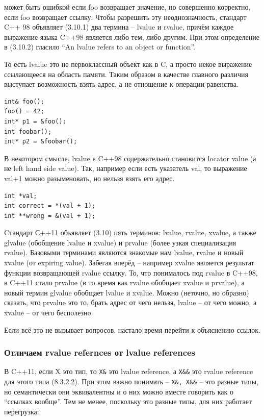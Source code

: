 \documentclass[a4paper,12pt,oneside]{article}
\begin{document}
может быть ошибкой если foo возвращает значение, но совершенно корректно, если foo возвращает ссылку. Чтобы разрешить эту неоднозначность, стандарт C++ 98 объявляет (3.10.1) два термина -- lvalue и rvalue, причём каждое выражение языка C++98 является либо тем, либо другим. При этом определение в (3.10.2) гласило ``An lvalue refers to an object or function''.

То есть lvalue это не первоклассный объект как в C, а просто некое выражение ссылающееся на область памяти. Таким образом в качестве главного различия выступает возможность взять адрес, а не отношение к операции равенства.

\begin{lstlisting}
int& foo();
foo() = 42;
int* p1 = &foo();
int foobar();
int* p2 = &foobar();
\end{lstlisting}

В некотором смысле, lvalue в C++98 содержательно становится locator value (а не left hand side value). Так, например если есть указатель val, то выражение val+1 можно разыменовать, но нельзя взять его адрес.

\begin{lstlisting}
int *val;
int correct = *(val + 1);
int **wrong = &(val + 1);
\end{lstlisting}

Cтандарт С++11 объявляет (3.10) пять терминов: lvalue, rvalue, xvalue, а также glvalue (обобщение lvalue и xvalue) и prvalue (более узкая специализация rvalue). Базовыми терминами являются знакомые нам lvalue, rvalue и новый xvalue (от expiring value). Забегая вперёд -- например xvalue является результат функции возвращающей rvalue ссылку. То, что понималось под rvalue в C++98, в C++11 стало prvalue (в то время как rvalue обобщает xvalue и prvalue), а новый термин glvalue обобщает lvalue и xvalue. Можно (неточно, но образно) сказать, что prvalue это то, брать адрес от чего нельзя, lvalue -- от чего можно, а xvalue -- от чего бесполезно.

Если всё это не вызывает вопросов, настало время перейти к объяснению ссылок.

\subsubsection{Отличаем rvalue refernces от lvalue references}

В C++11, если X это тип, то \lstinline!X&! это lvalue reference, а \lstinline!X&&! это rvalue reference для этого типа (8.3.2.2). При этом важно понимать -- \lstinline!X&, X&&! -- это разные типы, но семантически они эквивалентны и о них можно вместе говорить как о ``ссылках вообще''. Тем не менее, поскольку это разные типы, для них работает перегрузка:
\end{document}
